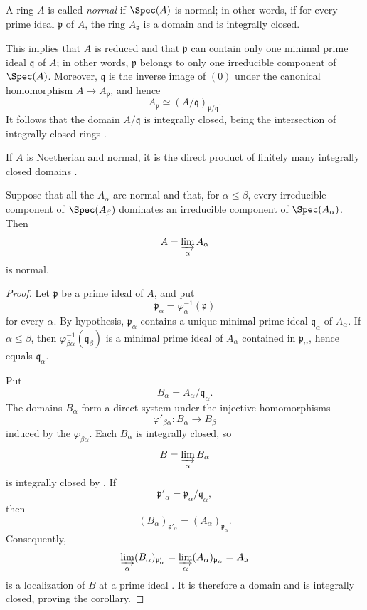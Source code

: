 \begin{env}[5.13.5]
\label{IV.5.13.5}
A ring $A$ is called \emph{normal} if $\Spec(A)$ is normal; in
other words, if for every prime ideal $\mathfrak p$ of $A$, the
ring $A_{\mathfrak p}$ is a domain and is integrally closed.

This implies that $A$ is reduced and that $\mathfrak p$ can
contain only one minimal prime ideal $\mathfrak q$ of $A$; in
other words, $\mathfrak p$ belongs to only one irreducible
component of $\Spec(A)$.  Moreover, $\mathfrak q$ is the inverse
image of $(0)$ under the canonical homomorphism
$A\to A_{\mathfrak p}$, and hence
\[
  A_{\mathfrak p}
  \simeq
  (A/\mathfrak q)_{\mathfrak p/\mathfrak q}.
\]
It follows that the domain $A/\mathfrak q$ is integrally closed,
being the intersection of integrally closed rings
.

If $A$ is Noetherian and normal, it is the direct product of
finitely many integrally closed domains .
\end{env}

\begin{corollary}[5.13.6]
\label{IV.5.13.6}
Suppose that all the $A_\alpha$ are normal and that, for
$\alpha\leq\beta$, every irreducible component of
$\Spec(A_\beta)$ dominates an irreducible component of
$\Spec(A_\alpha)$.  Then
\[
  A=\varinjlim_\alpha A_\alpha
\]
is normal.
\end{corollary}

\begin{proof}
Let $\mathfrak p$ be a prime ideal of $A$, and put
\[
  \mathfrak p_\alpha=\varphi_\alpha^{-1}(\mathfrak p)
\]
for every $\alpha$.  By hypothesis, $\mathfrak p_\alpha$
contains a unique minimal prime ideal $\mathfrak q_\alpha$ of
$A_\alpha$.  If $\alpha\leq\beta$, then
$\varphi_{\beta\alpha}^{-1}(\mathfrak q_\beta)$ is a minimal
prime ideal of $A_\alpha$ contained in $\mathfrak p_\alpha$,
hence equals $\mathfrak q_\alpha$.

Put
\[
  B_\alpha=A_\alpha/\mathfrak q_\alpha.
\]
The domains $B_\alpha$ form a direct system under the injective
homomorphisms
\[
  \varphi'_{\beta\alpha}:B_\alpha\longrightarrow B_\beta
\]
induced by the $\varphi_{\beta\alpha}$.  Each $B_\alpha$ is
integrally closed, so
\[
  B=\varinjlim_\alpha B_\alpha
\]
is integrally closed by .  If
\[
  \mathfrak p'_\alpha
  =\mathfrak p_\alpha/\mathfrak q_\alpha,
\]
then
\[
  (B_\alpha)_{\mathfrak p'_\alpha}
  =(A_\alpha)_{\mathfrak p_\alpha}.
\]
Consequently,
\[
  \varinjlim_\alpha(B_\alpha)_{\mathfrak p'_\alpha}
  =
  \varinjlim_\alpha(A_\alpha)_{\mathfrak p_\alpha}
  =
  A_{\mathfrak p}
\]
is a localization of $B$ at a prime ideal
.  It is therefore a domain and is integrally
closed, proving the corollary.
\end{proof}

